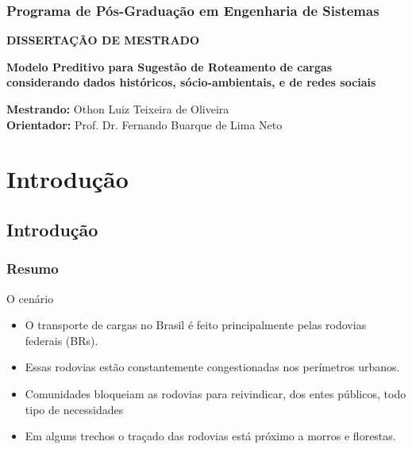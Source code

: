 \documentclass[11pt]{beamer}
\begin{document}
\begin{frame}\frametitle{ \Large Programa de Pós-Graduação em Engenharia de Sistemas}
	\begin{center}
		\Large \textbf{DISSERTAÇÃO DE MESTRADO} 
	\end{center}
	\pause
	\begin{block}
		\Large \textbf{Modelo Preditivo para Sugestão de Roteamento de cargas considerando dados históricos, sócio-ambientais, e de redes sociais}
	\end{block}
	
	\pause
	\vspace{0.3in}
	\textbf{Mestrando:} Othon Luiz Teixeira de Oliveira \\
	\textbf{Orientador:} Prof. Dr. Fernando Buarque de Lima Neto
	
\end{frame}


\section{ Introdução}
\subsection*{Introdução}


\begin{frame}\frametitle{Resumo}	
	\begin{block}{O cenário}
		\begin{itemize}
			\item O transporte de cargas no Brasil é feito principalmente pelas rodovias federais (BRs). 
			\pause
			\item Essas rodovias estão constantemente congestionadas nos perímetros urbanos.
			\pause
			\item Comunidades bloqueiam as rodovias para reivindicar, dos entes públicos, todo tipo de necessidades
			\pause
			\item Em alguns trechos o traçado das rodovias está próximo a morros e florestas.
		\end{itemize}
	\end{block}
\end{frame}
\end{document}
